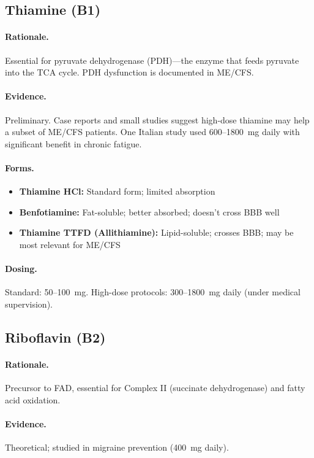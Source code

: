 \subsection{Thiamine (B1)}

\paragraph{Rationale.} Essential for pyruvate dehydrogenase (PDH)---the enzyme that feeds pyruvate into the TCA cycle. PDH dysfunction is documented in ME/CFS.

\paragraph{Evidence.} Preliminary. Case reports and small studies suggest high-dose thiamine may help a subset of ME/CFS patients. One Italian study used 600--1800~mg daily with significant benefit in chronic fatigue.

\paragraph{Forms.}
\begin{itemize}
    \item \textbf{Thiamine HCl:} Standard form; limited absorption
    \item \textbf{Benfotiamine:} Fat-soluble; better absorbed; doesn't cross BBB well
    \item \textbf{Thiamine TTFD (Allithiamine):} Lipid-soluble; crosses BBB; may be most relevant for ME/CFS
\end{itemize}

\paragraph{Dosing.} Standard: 50--100~mg. High-dose protocols: 300--1800~mg daily (under medical supervision).

\subsection{Riboflavin (B2)}

\paragraph{Rationale.} Precursor to FAD, essential for Complex II (succinate dehydrogenase) and fatty acid oxidation.

\paragraph{Evidence.} Theoretical; studied in migraine prevention (400~mg daily).

